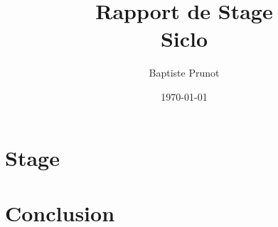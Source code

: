 \documentclass[11pt]{report}
\author{Baptiste Prunot}
\title{Rapport de Stage\\Siclo}
\date{\today}
\begin{document}
    \frontpage
    \tableofcontents
    \pagebreak
    
    
    \part{Stage}
    \part{Conclusion}
\end{document}
